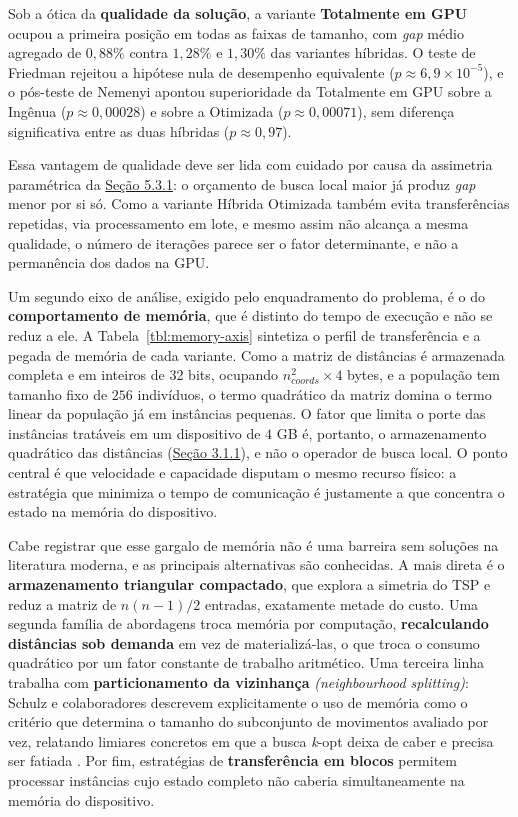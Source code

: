Sob a ótica da \textbf{qualidade da solução}, a variante \textbf{Totalmente em GPU} ocupou a primeira posição em todas as faixas de tamanho, com \emph{gap} médio agregado de \(0{,}88\%\) contra \(1{,}28\%\) e \(1{,}30\%\) das variantes híbridas.
O teste de Friedman rejeitou a hipótese nula de desempenho equivalente (\(p \approx 6{,}9 \times 10^{-5}\)), e o pós-teste de Nemenyi apontou superioridade da Totalmente em GPU sobre a Ingênua (\(p \approx 0{,}00028\)) e sobre a Otimizada (\(p \approx 0{,}00071\)), sem diferença significativa entre as duas híbridas (\(p \approx 0{,}97\)).

Essa vantagem de qualidade deve ser lida com cuidado por causa da assimetria paramétrica da \hyperref[sec-531-assimetria-parametrica]{Seção 5.3.1}: o orçamento de busca local maior já produz \emph{gap} menor por si só.
Como a variante Híbrida Otimizada também evita transferências repetidas, via processamento em lote, e mesmo assim não alcança a mesma qualidade, o número de iterações parece ser o fator determinante, e não a permanência dos dados na GPU.

Um segundo eixo de análise, exigido pelo enquadramento do problema, é o do \textbf{comportamento de memória}, que é distinto do tempo de execução e não se reduz a ele. A Tabela~\ref{tbl:memory-axis} sintetiza o perfil de transferência e a pegada de memória de cada variante.
Como a matriz de distâncias é armazenada completa e em inteiros de 32 bits, ocupando \(n_{coords}^2 \times 4\) bytes, e a população tem tamanho fixo de \(256\) indivíduos, o termo quadrático da matriz domina o termo linear da população já em instâncias pequenas.
O fator que limita o porte das instâncias tratáveis em um dispositivo de \(4\) GB é, portanto, o armazenamento quadrático das distâncias (\hyperref[sec-311-hardware-software]{Seção 3.1.1}), e não o operador de busca local.
O ponto central é que velocidade e capacidade disputam o mesmo recurso físico: a estratégia que minimiza o tempo de comunicação é justamente a que concentra o estado na memória do dispositivo.

Cabe registrar que esse gargalo de memória não é uma barreira sem soluções na literatura moderna, e as principais alternativas são conhecidas.
A mais direta é o \textbf{armazenamento triangular compactado}, que explora a simetria do TSP e reduz a matriz de \(n(n-1)/2\) entradas, exatamente metade do custo.
Uma segunda família de abordagens troca memória por computação, \textbf{recalculando distâncias sob demanda} em vez de materializá-las, o que troca o consumo quadrático por um fator constante de trabalho aritmético.
Uma terceira linha trabalha com \textbf{particionamento da vizinhança} \emph{(neighbourhood splitting)}: Schulz e colaboradores descrevem explicitamente o uso de memória como o critério que determina o tamanho do subconjunto de movimentos avaliado por vez, relatando limiares concretos em que a busca \emph{k}-opt deixa de caber e precisa ser fatiada \autocite{schulz2013gpu}.
Por fim, estratégias de \textbf{transferência em blocos} permitem processar instâncias cujo estado completo não caberia simultaneamente na memória do dispositivo.

